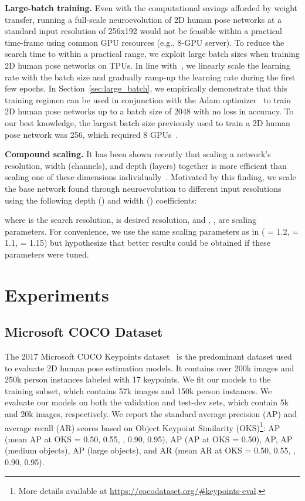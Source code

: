 \documentclass[final]{cvpr}
\begin{document}
\medskip\noindent\textbf{Large-batch training.} Even with the computational savings afforded by weight transfer, running a full-scale neuroevolution of 2D human pose networks at a standard input resolution of 256x192 would not be feasible within a practical time-frame using common GPU resources (e.g., 8-GPU server). To reduce the search time to within a practical range, we exploit large batch sizes when training 2D human pose networks on TPUs. In line with~\cite{goyal2017accurate}, we linearly scale the learning rate with the batch size and gradually ramp-up the learning rate during the first few epochs. In Section~\ref{sec:large_batch}, we empirically demonstrate that this training regimen can be used in conjunction with the Adam optimizer~\cite{kingma2014adam} to train 2D human pose networks up to a batch size of 2048 with no loss in accuracy. To our best knowledge, the largest batch size previously used to train a 2D human pose network was 256, which required 8 GPUs~\cite{li2019rethinking}.

\medskip\noindent\textbf{Compound scaling.} It has been shown recently that scaling a network's resolution, width (channels), and depth (layers) together is more efficient than scaling one of these dimensions individually~\cite{tan2019efficientnet}. Motivated by this finding, we scale the base network found through neuroevolution to different input resolutions using the following depth () and width () coefficients:
\vspace{-8pt}

where  is the search resolution,  is desired resolution, and , ,  are scaling parameters. For convenience, we use the same scaling parameters as in \cite{tan2019efficientnet} ( = 1.2,  = 1.1,  = 1.15) but hypothesize that better results could be obtained if these parameters were tuned. 


\section{Experiments}

\subsection{Microsoft COCO Dataset}
The 2017 Microsoft COCO Keypoints dataset~\cite{lin2014microsoft} is the predominant dataset used to evaluate 2D human pose estimation models. It contains over 200k images and 250k person instances labeled with 17 keypoints. We fit our models to the training subset, which contains 57k images and 150k person instances. We evaluate our models on both the validation and test-dev sets, which contain 5k and 20k images, respectively. We report the standard average precision (AP) and average recall (AR) scores based on Object Keypoint Similarity (OKS)\footnote{More details available at \href{https://cocodataset.org/\#keypoints-eval}{https://cocodataset.org/\#keypoints-eval}.}: AP (mean AP at OKS = 0.50, 0.55, , 0.90, 0.95), AP (AP at OKS = 0.50), AP, AP (medium objects), AP (large objects), and AR (mean AR at OKS = 0.50, 0.55, , 0.90, 0.95).
\end{document}
